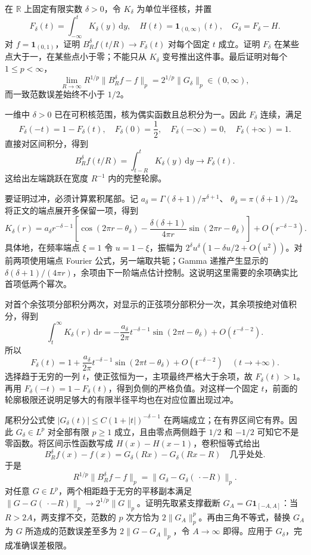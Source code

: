 \begin{exercise}\label{b2:ex:24-new-8}
在 \(\mathbb R\) 上固定有限实数 \(\delta>0\)，令 \(K_\delta\) 为单位半径核，并置
\[
 F_\delta(t)=\int_{-\infty}^tK_\delta(y)\,\mathrm dy,
 \quad H(t)=\mathbf1_{(0,\infty)}(t),
 \quad G_\delta=F_\delta-H.
\]
对 \(f=\mathbf1_{(0,1)}\)，证明 \(B_R^\delta f(t/R)\to F_\delta(t)\) 对每个固定 \(t\) 成立。证明 \(F_\delta\) 在某些点大于一，在某些点小于零；不能只从 \(K_\delta\) 变号推出这件事。最后证明对每个 \(1\leq p<\infty\)，
\[
 \lim_{R\to\infty}R^{1/p}\|B_R^\delta f-f\|_p
       =2^{1/p}\|G_\delta\|_p\in(0,\infty),
\]
而一致范数误差始终不小于 \(1/2\)。
\end{exercise}
\begin{solution}
一维中 \(\delta>0\) 已在可积核范围，核为偶实函数且总积分为一。因此 \(F_\delta\) 连续，满足
\[
 F_\delta(-t)=1-F_\delta(t),
 \quad F_\delta(0)=\frac12,
 \quad F_\delta(-\infty)=0,\quad F_\delta(+\infty)=1.
\]
直接对区间积分，得到
\[
 B_R^\delta f(t/R)=\int_{t-R}^tK_\delta(y)\,\mathrm dy
       \longrightarrow F_\delta(t).
\]
这给出左端跳跃在宽度 \(R^{-1}\) 内的完整轮廓。

要证明过冲，必须计算累积尾部。记
\(a_\delta=\Gamma(\delta+1)/\pi^{\delta+1}\)、
\(\theta_\delta=\pi(\delta+1)/2\)。将正文的端点展开多保留一项，得到
\[
 K_\delta(r)=a_\delta r^{-\delta-1}
 \left[\cos(2\pi r-\theta_\delta)
       -\frac{\delta(\delta+1)}{4\pi r}
           \sin(2\pi r-\theta_\delta)\right]
       +O(r^{-\delta-3}).
\]
具体地，在频率端点 \(\xi=1\) 令 \(u=1-\xi\)，振幅为
\(2^\delta u^\delta(1-\delta u/2+O(u^2))\)。对前两项使用端点 Fourier 公式，另一端取共轭；Gamma 递推产生显示的 \(\delta(\delta+1)/(4\pi r)\)，余项由下一阶端点估计控制。这说明这里需要的余项确实比首项低两个幂次。

对首个余弦项分部积分两次，对显示的正弦项分部积分一次，其余项按绝对值积分，得到
\[
 \int_t^\infty K_\delta(r)\,\mathrm dr
 =-\frac{a_\delta}{2\pi}t^{-\delta-1}
       \sin(2\pi t-\theta_\delta)+O(t^{-\delta-2}).
\]
所以
\[
 F_\delta(t)=1+\frac{a_\delta}{2\pi}t^{-\delta-1}
       \sin(2\pi t-\theta_\delta)+O(t^{-\delta-2})
       \quad(t\to+\infty).
\]
选择趋于无穷的一列 \(t\)，使正弦恒为一，主项最终严格大于余项，故 \(F_\delta(t)>1\)。再用 \(F_\delta(-t)=1-F_\delta(t)\)，得到负侧的严格负值。对这样一个固定 \(t\)，前面的轮廓极限还说明足够大的有限半径平均也在对应位置出现过冲。

尾积分公式使 \(|G_\delta(t)|\leq C(1+|t|)^{-\delta-1}\) 在两端成立；在有界区间它有界。因此 \(G_\delta\in L^p\) 对全部有限 \(p\geq1\) 成立，且由零点两侧趋于 \(1/2\) 和 \(-1/2\) 可知它不是零函数。将区间示性函数写成 \(H(x)-H(x-1)\)，卷积恒等式给出
\[
 B_R^\delta f(x)-f(x)
       =G_\delta(Rx)-G_\delta(Rx-R)
       \quad\text{几乎处处}.
\]
于是
\[
 R^{1/p}\|B_R^\delta f-f\|_p
       =\|G_\delta-G_\delta(\,\cdot-R)\|_p.
\]
对任意 \(G\in L^p\)，两个相距趋于无穷的平移副本满足
\(\|G-G(\,\cdot-R)\|_p\to2^{1/p}\|G\|_p\)。证明先取紧支撑截断 \(G_A=G\mathbf1_{[-A,A]}\)：当 \(R>2A\)，两支撑不交，范数的 \(p\) 次方恰为 \(2\|G_A\|_p^p\)。再由三角不等式，替换 \(G_A\) 为 \(G\) 所造成的范数误差至多为 \(2\|G-G_A\|_p\)，令 \(A\to\infty\) 即得。应用于 \(G_\delta\)，完成准确误差极限。


\end{solution}
